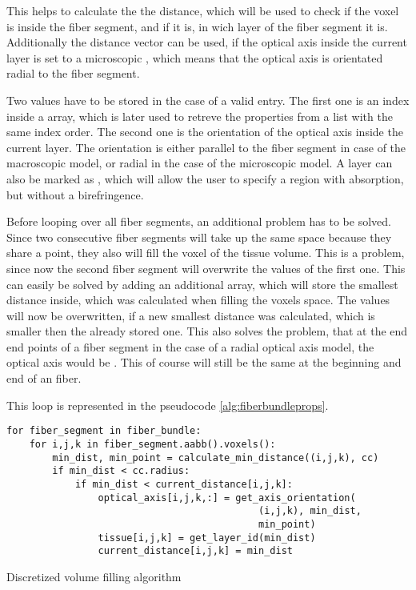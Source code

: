 This helps to calculate the the distance, which will be used to check if the voxel is inside the fiber segment, and if it is, in wich layer of the fiber segment it is.
Additionally the distance vector can be used, if the optical axis inside the current layer is set to a microscopic \dummy{}, which means that the optical axis is orientated radial to the fiber segment.
\par
% 
Two values have to be stored in the case of a valid entry.
The first one is an index inside a  array, which is later used to retreve the properties from a list with the same index order.
The second one is the orientation of the optical axis inside the current layer.
The orientation is either parallel to the fiber segment in case of the macroscopic model, or radial in the case of the microscopic model.
A layer can also be marked as , which will allow the user to specify a region with absorption, but without a birefringence.
\par
% 
Before looping over all fiber segments, an additional problem has to be solved.
Since two consecutive fiber segments will take up the same space because they share a point, they also will fill the voxel of the tissue volume.
This is a problem, since now the second fiber segment will overwrite the values of the first one.
This can easily be solved by adding an additional array, which will store the smallest distance inside, which was calculated when filling the voxels space.
The values will now be overwritten, if a new smallest distance was calculated, which is smaller then the already stored one.
This also solves the problem, that at the end end points of a fiber segment in the case of a radial optical axis model, the optical axis would be .
This of course will still be the same at the beginning and end of an fiber.
\par
% 
This  loop is represented in the pseudocode \cref{alg:fiberbundleprops}.
% 
\begin{lstfloat}[!tb]
\lstset{style=python}
\begin{lstlisting}[]
for fiber_segment in fiber_bundle:
    for i,j,k in fiber_segment.aabb().voxels():
        min_dist, min_point = calculate_min_distance((i,j,k), cc)
        if min_dist < cc.radius:
            if min_dist < current_distance[i,j,k]:
                optical_axis[i,j,k,:] = get_axis_orientation(
                                            (i,j,k), min_dist,
                                            min_point)
                tissue[i,j,k] = get_layer_id(min_dist)
                current_distance[i,j,k] = min_dist
\end{lstlisting}
\caption{Discretized volume filling algorithm}
\label{alg:fiberbundleprops}
\end{lstfloat}
%
% 
% 
% 
